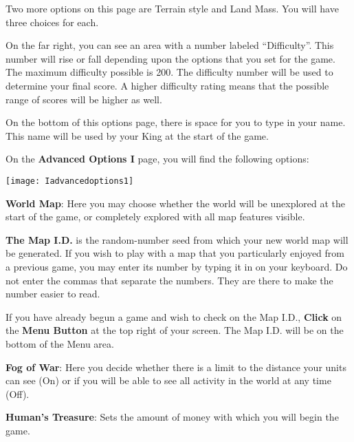 Two more options on this page are Terrain style and Land Mass. You will have three choices for each.

On the far right, you can see an area with a number labeled “Difficulty”. This number will rise or fall depending upon the options that you set for the game. The maximum difficulty possible is 200. The difficulty number will be used to determine your final score. A higher difficulty rating means that the possible range of scores will be higher as well.

On the bottom of this options page, there is space for you to type in your name. This name will be used by your King at the start of the game.

On the \textbf{Advanced Options I} page, you will find the following options:

\begin{center}
    \texttt{[image: Iadvancedoptions1]} %
\end{center}

\textbf{World Map}: Here you may choose whether the world will be unexplored at the start of the game, or completely explored with all map features visible.


\begin{changemargin}{0.5cm}{0cm} 
 \textbf{The Map I.D.} is the random-number seed from which your new world map will be generated. If you wish to play with a map that you particularly enjoyed from a previous game, you may enter its number by typing it in on your keyboard. Do not enter the commas that separate the numbers. They are there to make the number easier to read.
\end{changemargin}

\begin{changemargin}{0.5cm}{0cm} 
 If you have already begun a game and wish to check on the Map I.D., \textbf{Click} on the \textbf{Menu Button} at the top right of your screen. The Map I.D. will be on the bottom of the Menu area.
\end{changemargin}


\textbf{Fog of War}: Here you decide whether there is a limit to the distance your units can see (On) or if you will be able to see all activity in the world at any time (Off).


\textbf{Human’s Treasure}: Sets the amount of money with which you will begin the game.

